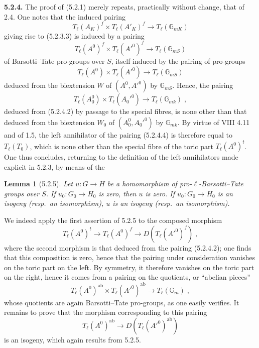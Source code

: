 \documentclass[11pt]{article}
\newtheorem{lemme}[proposition]{Lemma}
\newcommand{\GG}{\mathbb G}
\newcommand{\Tl}{T_{\ell}}
\newcommand{\ab}{\mathrm{ab}}
\begin{document}
\medskip

\noindent\textbf{5.2.4.} The proof of (5.2.1) merely repeats, practically
without change, that of 2.4. One notes that the induced pairing
\begin{equation}
\Tl(A_K)^f \times \Tl(A'_K)^f \longrightarrow \Tl(\GG_{mK})
\end{equation}
giving rise to (5.2.3.3) is induced by a pairing
\begin{equation}
\Tl(A^0)^f \times \Tl(A'^0)^f \longrightarrow \Tl(\GG_{mS})
\end{equation}
of Barsotti--Tate pro-groups over $S$, itself induced by the pairing of
pro-groups
\begin{equation}
\Tl(A^0) \times \Tl(A'^0) \longrightarrow \Tl(\GG_{mS})
\end{equation}
deduced from the biextension $W$ of $(A^0, A'^0)$ by $\GG_{mS}$. Hence,
the pairing
\begin{equation}
\Tl(A_0^0) \times \Tl(A_0'^0) \longrightarrow \Tl(\GG_{mk})
\; ,
\end{equation}
deduced from (5.2.4.2) by passage to the special fibres, is none other
than that deduced from the biextension $W_0$ of $(A_0^0, A_0'^0)$ by
$\GG_{mk}$. By virtue of VIII 4.11 and of 1.5, the left annihilator of
the pairing (5.2.4.4) is therefore equal to $\Tl(T_0)$, which is none
other than the special fibre of the toric part $\Tl(A^0)^t$. One thus
concludes, returning to the definition of the left annihilators made
explicit in 5.2.3, by means of the

\begin{lemme}[5.2.5]
Let $u \colon G \to H$ be a homomorphism of pro-$\ell$-Barsotti--Tate
groups over $S$. If $u_0 \colon G_0 \to H_0$ is zero, then $u$ is zero.
If $u_0 \colon G_0 \to H_0$ is an isogeny \emph{(resp.~an isomorphism)},
$u$ is an isogeny \emph{(resp.~an isomorphism)}.
\end{lemme}

We indeed apply the first assertion of 5.2.5 to the composed morphism
\[
\Tl(A^0)^t \longrightarrow \Tl(A^0)^f \longrightarrow
D(\Tl(A'^0)^f) \; ,
\]
where the second morphism is that deduced from the pairing (5.2.4.2);
one finds that this composition is zero, hence that the pairing under
consideration vanishes on the toric part on the left. By symmetry, it
therefore vanishes on the toric part on the right, hence it comes from a
pairing on the quotients, or ``abelian pieces''
\[
\Tl(A^0)^{\ab} \times \Tl(A'^0)^{\ab} \longrightarrow \Tl(\GG_m)
\; ,
\]
whose quotients are again Barsotti--Tate pro-groups, as one easily
verifies. It remains to prove that the morphism corresponding to this
pairing
\[
\Tl(A^0)^{\ab} \longrightarrow D(\Tl(A'^0)^{\ab})
\]
is an isogeny, which again results from 5.2.5.
\end{document}
